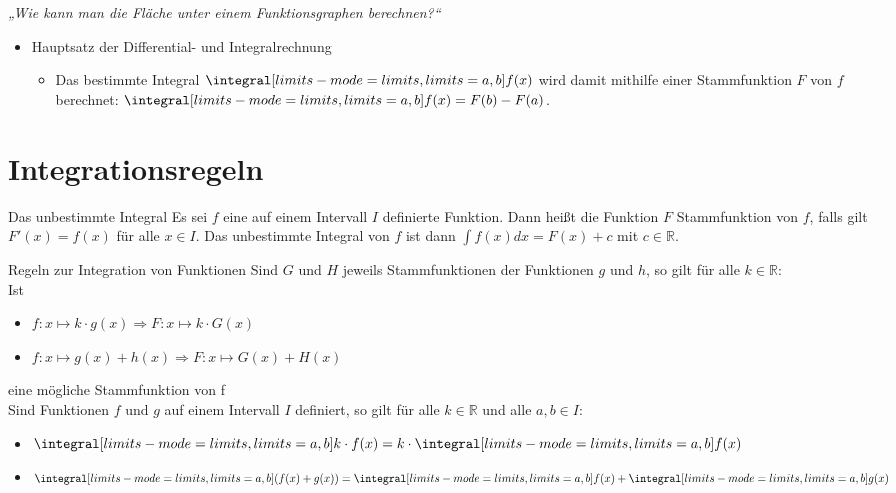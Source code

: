 \begin{b8d}{\emph{„Wie kann man die Fläche unter einem Funktionsgraphen berechnen?“}}{}
\begin{itemize}

\item Hauptsatz der Differential- und Integralrechnung
\begin{itemize}
    \item Das bestimmte Integral $\integral[limits-mode=limits,limits={a, b}]{f(x)}$  wird damit mithilfe einer Stammfunktion $F$ von $f$ berechnet: $\integral[limits-mode=limits,limits={a, b}]{f(x)}=F(b)-F(a)$.
\end{itemize}
\end{itemize}
\end{b8d}
\section{Integrationsregeln}
\begin{defi}{Das unbestimmte Integral}{}\label{InteRegel}
Es sei $f$ eine auf einem Intervall $I$ definierte Funktion. Dann heißt die Funktion $F$ Stammfunktion von $f$, falls gilt $F'(x) = f(x) $ für alle $x\in I$. Das unbestimmte Integral von $f$ ist dann $\int f(x) dx = F(x) +c$ mit $c\in \mathds{R}$.
\end{defi}
\begin{merke}{Regeln zur Integration von Funktionen}{}
    Sind $G$ und $H$ jeweils Stammfunktionen der Funktionen $g$ und $h$, so gilt für alle $k\in \mathds{R}$:\\
    Ist
    \begin{itemize}
        \item $f: x \mapsto k \cdot g(x) \Rightarrow F: x\mapsto k \cdot G(x)$ 
        \item $f: x\mapsto g(x) + h(x) \Rightarrow F: x\mapsto G(x) + H(x)$
    \end{itemize}
    eine mögliche Stammfunktion von f\\
    Sind Funktionen $f$ und $g$ auf einem Intervall $I$ definiert, so gilt für alle $k\in \mathds{R}$ und alle $a,b \in I$:
    \begin{itemize}
        \item $\integral[limits-mode=limits,limits={a, b}]{k \cdot f(x)} = k \cdot \integral[limits-mode=limits,limits={a, b}]{f(x)}$
        \item $\integral[limits-mode=limits,limits={a, b}]{(f(x) + g(x))} = \integral[limits-mode=limits,limits={a, b}]{f(x)} + \integral[limits-mode=limits,limits={a, b}]{g(x)}$
    \end{itemize}
\end{merke}

